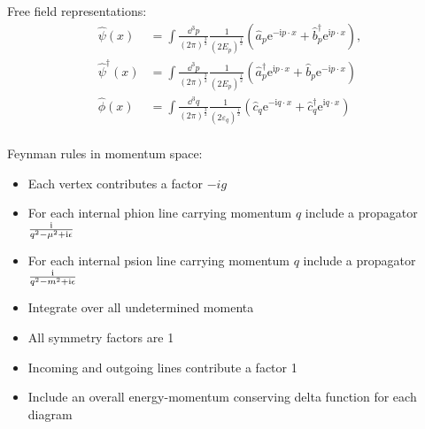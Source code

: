 		\noindent
		Free field representations:
		\begin{equation}
			\begin{aligned}
				\hat{\psi}(x) &= \int\frac{\dd^{3}p}{\left(2\pi\right)^{\frac{3}{2}}}\frac{1}{(2E_{p})^{\frac{1}{2}}}\left(\hat{a}_{p}\mathrm{e}^{-\mathrm{i}p\cdot x}+\hat{b}_{p}^{\dagger}\mathrm{e}^{\mathrm{i}p\cdot x}\right), \\
				\hat{\psi}^{\dagger}(x) &= \int\frac{\dd^{3}p}{(2\pi)^{\frac{3}{2}}}\frac{1}{(2E_{p})^{\frac{1}{2}}}\left(\hat{a}_{p}^{\dagger}\mathrm{e}^{\mathrm{i}p\cdot x}+\hat{b}_{p}\mathrm{e}^{-\mathrm{i}p\cdot x}\right) \\
				\hat{\phi}(x) &=\int\frac{\dd^{3}q}{\left(2\pi\right)^{\frac{3}{2}}}\frac{1}{\left(2\varepsilon_{q}\right)^{\frac{1}{2}}}\left(\hat{c}_{q}\mathrm{e}^{-\mathrm{i}q\cdot x}+\hat{c}_{q}^{\dagger}\mathrm{e}^{\mathrm{i}q\cdot x}\right) \\
			\end{aligned}
		\end{equation}

		\noindent
		Feynman rules in momentum space:
		\begin{itemize}\itemsep -0pt
			\item Each vertex contributes a factor $-ig$
			\item For each internal phion line carrying momentum $q$ include a propagator $\frac{\mathrm{i}}{q^2 -\mu^2+\mathrm{i}\epsilon}$
			\item For each internal psion line carrying momentum $q$ include a
			propagator $\frac{\mathrm{i}}{q^2 -m^2+\mathrm{i}\epsilon}$
			\item Integrate over all undetermined momenta
			\item All symmetry factors are 1
			\item Incoming and outgoing lines contribute a factor 1
			\item Include an overall energy-momentum conserving delta function
			for each diagram
		\end{itemize}
		
